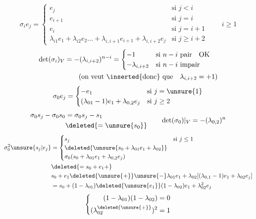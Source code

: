 \[
\sigma_i e_j=\begin{cases}
e_j&\text{si }j<i\\
e_{i+1}&\text{si }j=i\\
e_i&\text{si }j=i+1\\
\lambda_{i1}e_1+\lambda_{i2}e_2\ldots+\lambda_{i,i+1}e_{i+1}+\lambda_{i,i+2}e_j&\text{si }j\geq i+2
\end{cases}\qquad i\geq1
\]
\[
\begin{aligned}
\det(\sigma_i)_V&=-(\lambda_{i,i+2})^{n-i}
=\begin{cases}-1&\text{si }n-i\text{ pair}\quad\text{OK}\\-\lambda_{i,i+2}&\text{si }n-i\text{ impair}\end{cases}\\
&\qquad\text{(on veut \inserted{donc} que}\quad\lambda_{i,i+2}=+1\text{)}
\end{aligned}
\]
\[
\sigma_0e_j=\begin{cases}-e_1&\text{si }j=\unsure{1}\\(\lambda_{01}-1)e_1+\lambda_{0,2}e_j&\text{si }j\geq2\end{cases}
\]
\[
\begin{aligned}
\sigma_0s_j-\sigma_0s_0&=\sigma_0s_j-s_1\\
&\deleted{=\unsure{s_0}}
\end{aligned}
\qquad
\det(\sigma_0)|_V=-(\lambda_{0,2})^n
\]
\[
\begin{aligned}
\sigma_0^2\unsure{s_j|e_j}&=\begin{cases}
s_j&\text{si }j\leq1\\
\deleted{\unsure{s_0+\lambda_{01}e_1+\lambda_{02}}}\\
\sigma_0(s_0+\lambda_{01}e_1+\lambda_{0,2}e_j)
\end{cases}\\
&\deleted{=s_0+e_1+}\\
&s_0+e_1\deleted{\unsure{+}}\unsure{-}\lambda_{01}e_1+\lambda_{02}[(\lambda_{0,1}-1)e_1+\lambda_{02}e_j]\\
&=s_0+(1-\lambda_{01})\deleted{\unsure{e_1}}(1-\lambda_{02})e_1+\lambda_{02}^2e_j
\end{aligned}
\]
\[
\left\{\begin{aligned}(1-\lambda_{01})(1-\lambda_{02})&=0\\(\lambda_{02}^{\deleted{\unsure{+}}})^2&=1\end{aligned}\right.
\]
